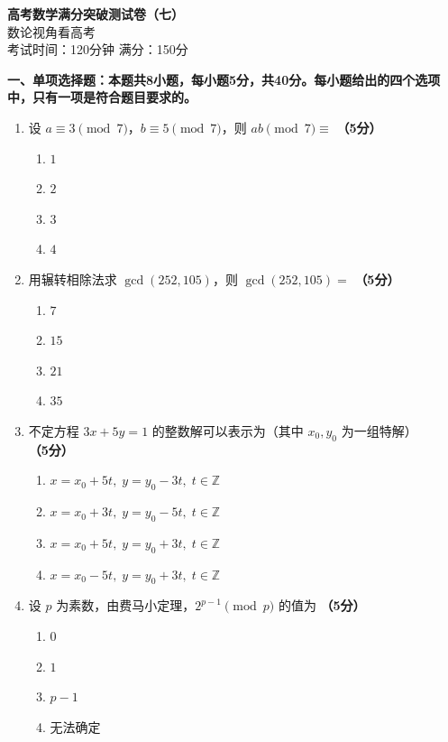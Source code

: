 \documentclass[12pt, a4paper]{ctexart}
\newcommand{\score}[1]{\hfill\textbf{（#1分）}}
\begin{document}
\begin{center}
{\LARGE\bfseries 高考数学满分突破测试卷（七）}\\[8pt]
{\large 数论视角看高考}\\[6pt]
考试时间：120分钟 \quad 满分：150分
\end{center}

\vspace{10pt}

{\large\bfseries 一、单项选择题：本题共8小题，每小题5分，共40分。每小题给出的四个选项中，只有一项是符合题目要求的。}

\vspace{8pt}

\begin{enumerate}

\item 设 $a\equiv 3\pmod{7}$，$b\equiv 5\pmod{7}$，则 $ab\pmod{7}\equiv$ \score{5}
\begin{enumerate}[label=\Alph*.]
    \item $1$
    \item $2$
    \item $3$
    \item $4$
\end{enumerate}

\item 用辗转相除法求 $\gcd(252,105)$，则 $\gcd(252,105)=$ \score{5}
\begin{enumerate}[label=\Alph*.]
    \item $7$
    \item $15$
    \item $21$
    \item $35$
\end{enumerate}

\item 不定方程 $3x+5y=1$ 的整数解可以表示为（其中 $x_0,y_0$ 为一组特解） \score{5}
\begin{enumerate}[label=\Alph*.]
    \item $x=x_0+5t,\; y=y_0-3t,\; t\in\mathbb{Z}$
    \item $x=x_0+3t,\; y=y_0-5t,\; t\in\mathbb{Z}$
    \item $x=x_0+5t,\; y=y_0+3t,\; t\in\mathbb{Z}$
    \item $x=x_0-5t,\; y=y_0+3t,\; t\in\mathbb{Z}$
\end{enumerate}

\item 设 $p$ 为素数，由费马小定理，$2^{p-1}\pmod{p}$ 的值为 \score{5}
\begin{enumerate}[label=\Alph*.]
    \item $0$
    \item $1$
    \item $p-1$
    \item 无法确定
\end{enumerate}


\end{enumerate}
\end{document}
